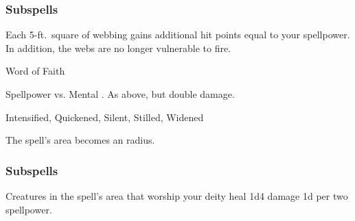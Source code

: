 \subsubsection{Subspells}
Each 5-ft.\ square of webbing gains additional hit points equal to your spellpower.
In addition, the webs are no longer vulnerable to fire.
\begin{spellsection}{Word of Faith}
\begin{spellheader}
\end{spellheader}
\begin{spellcontent}
\begin{spelltargetinginfo}
\end{spelltargetinginfo}
\begin{spelleffects}
\begin{spellattack}{Spellpower vs. Mental}
\spellsuccess {}.
\spellcritical As above, but double damage.
\end{spellattack}
\end{spelleffects}
\end{spellcontent}
\begin{spellfooter}
 Intensified, Quickened, Silent, Stilled, Widened
\end{spellfooter}
\begin{spellsubcontent}
\begin{spellcantrip}
The spell's area becomes an \areasmall radius.
\end{spellcantrip}
\end{spellsubcontent}
\end{spellsection}
\subsubsection{Subspells}
Creatures in the spell's area that worship your deity heal 1d4 damage \plus1d per two spellpower.